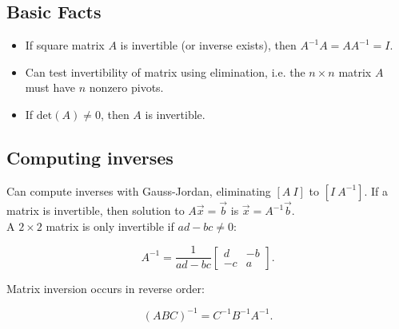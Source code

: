 \subsection{Basic Facts}

\begin{itemize}
    \item If square matrix $A$ is invertible (or inverse exists), then $\boxed{A^{-1}A=AA^{-1}=I}$.
    \item Can test invertibility of matrix using elimination, i.e. the $n\times n$ matrix $A$ must have $n$ nonzero pivots.
    \item If $\mathrm{det}(A)\neq 0$, then $A$ is invertible.
\end{itemize}

\subsection{Computing inverses}

Can compute inverses with Gauss-Jordan, eliminating $[A\:I]$ to $[I\:A^{-1}]$. 
If a matrix is invertible, then solution to $A\vec{x}=\vec{b}$ is $\vec{x}=A^{-1}\vec{b}$.\\

A $2\times 2$ matrix is only invertible if $ad-bc\neq 0$:

\[\boxed{
    A^{-1}=
    \frac{1}{ad-bc}
    \begin{bmatrix}
        d&-b\\
        -c&a
    \end{bmatrix}
.}\]

Matrix inversion occurs in reverse order:

\[\boxed{(ABC)^{-1}=C^{-1}B^{-1}A^{-1}}.\]